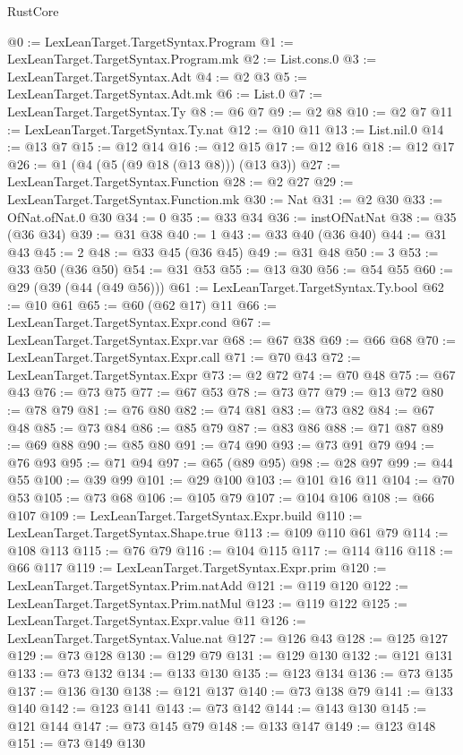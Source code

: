 \begin{lexlean}{RustCore}
\begin{coremodule}
@0 := LexLeanTarget.TargetSyntax.Program
@1 := LexLeanTarget.TargetSyntax.Program.mk
@2 := List.cons.{0}
@3 := LexLeanTarget.TargetSyntax.Adt
@4 := @2 @3
@5 := LexLeanTarget.TargetSyntax.Adt.mk
@6 := List.{0}
@7 := LexLeanTarget.TargetSyntax.Ty
@8 := @6 @7
@9 := @2 @8
@10 := @2 @7
@11 := LexLeanTarget.TargetSyntax.Ty.nat
@12 := @10 @11
@13 := List.nil.{0}
@14 := @13 @7
@15 := @12 @14
@16 := @12 @15
@17 := @12 @16
@18 := @12 @17
@26 := @1 (@4 (@5 (@9 @18 (@13 @8))) (@13 @3))
@27 := LexLeanTarget.TargetSyntax.Function
@28 := @2 @27
@29 := LexLeanTarget.TargetSyntax.Function.mk
@30 := Nat
@31 := @2 @30
@33 := OfNat.ofNat.{0} @30
@34 := 0
@35 := @33 @34
@36 := instOfNatNat
@38 := @35 (@36 @34)
@39 := @31 @38
@40 := 1
@43 := @33 @40 (@36 @40)
@44 := @31 @43
@45 := 2
@48 := @33 @45 (@36 @45)
@49 := @31 @48
@50 := 3
@53 := @33 @50 (@36 @50)
@54 := @31 @53
@55 := @13 @30
@56 := @54 @55
@60 := @29 (@39 (@44 (@49 @56)))
@61 := LexLeanTarget.TargetSyntax.Ty.bool
@62 := @10 @61
@65 := @60 (@62 @17) @11
@66 := LexLeanTarget.TargetSyntax.Expr.cond
@67 := LexLeanTarget.TargetSyntax.Expr.var
@68 := @67 @38
@69 := @66 @68
@70 := LexLeanTarget.TargetSyntax.Expr.call
@71 := @70 @43
@72 := LexLeanTarget.TargetSyntax.Expr
@73 := @2 @72
@74 := @70 @48
@75 := @67 @43
@76 := @73 @75
@77 := @67 @53
@78 := @73 @77
@79 := @13 @72
@80 := @78 @79
@81 := @76 @80
@82 := @74 @81
@83 := @73 @82
@84 := @67 @48
@85 := @73 @84
@86 := @85 @79
@87 := @83 @86
@88 := @71 @87
@89 := @69 @88
@90 := @85 @80
@91 := @74 @90
@93 := @73 @91 @79
@94 := @76 @93
@95 := @71 @94
@97 := @65 (@89 @95)
@98 := @28 @97
@99 := @44 @55
@100 := @39 @99
@101 := @29 @100
@103 := @101 @16 @11
@104 := @70 @53
@105 := @73 @68
@106 := @105 @79
@107 := @104 @106
@108 := @66 @107
@109 := LexLeanTarget.TargetSyntax.Expr.build
@110 := LexLeanTarget.TargetSyntax.Shape.true
@113 := @109 @110 @61 @79
@114 := @108 @113
@115 := @76 @79
@116 := @104 @115
@117 := @114 @116
@118 := @66 @117
@119 := LexLeanTarget.TargetSyntax.Expr.prim
@120 := LexLeanTarget.TargetSyntax.Prim.natAdd
@121 := @119 @120
@122 := LexLeanTarget.TargetSyntax.Prim.natMul
@123 := @119 @122
@125 := LexLeanTarget.TargetSyntax.Expr.value @11
@126 := LexLeanTarget.TargetSyntax.Value.nat
@127 := @126 @43
@128 := @125 @127
@129 := @73 @128
@130 := @129 @79
@131 := @129 @130
@132 := @121 @131
@133 := @73 @132
@134 := @133 @130
@135 := @123 @134
@136 := @73 @135
@137 := @136 @130
@138 := @121 @137
@140 := @73 @138 @79
@141 := @133 @140
@142 := @123 @141
@143 := @73 @142
@144 := @143 @130
@145 := @121 @144
@147 := @73 @145 @79
@148 := @133 @147
@149 := @123 @148
@151 := @73 @149 @130

\end{coremodule}
\end{lexlean}
